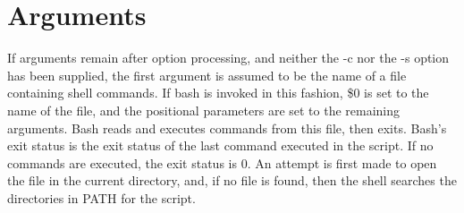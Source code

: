 \section{Arguments}\label{sec:arguments}
If arguments remain after option processing, and neither the -c nor the -s option has been supplied, the first argument is assumed to be the name of a file containing shell commands. If bash is invoked in this fashion, \$0 is set to the name of the file, and the positional parameters are set to the remaining arguments. Bash reads and executes commands from this file, then exits. Bash's exit status is the exit status of the last command executed in the script. If no commands are executed, the exit status is 0. An attempt is first made to open the file in the current directory, and, if no file is found, then the shell searches the directories in PATH for the script.